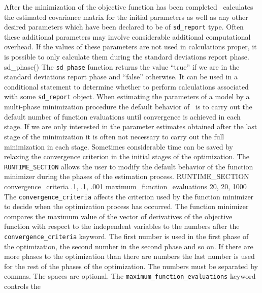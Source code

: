 \documentclass[12pt]{book}
\begin{document}
After the minimization of the objective function has been completed
\ADM\ calculates the estimated covariance matrix for the
initial parameters as well as any other desired parameters which
have been declared to be of {\tt sd\_report} type. Often 
these additional parameters may involve
considerable additional computational overhead. If the values of 
these parameters are not used in calculations proper, it is possible to
only calculate them during the standard deviations report phase.
\beginexample 
sd_phase()
\endexample
\noindent The {\tt sd\_phase} function returns the value ``true'' if
we are in the standard deviations report phase and ``false''
otherwise. It can be used in a conditional statement to determine
whether to perform calculations associated with some 
{\tt sd\_report} object. 
When  estimating the parameters of a model by a multi-phase
minimization procedure the default behavior of \ADM\ is to
carry out the default number of function evaluations until 
convergence is achieved in each stage. If we are only interested
in the parameter estimates obtained after the last stage of
the minimization it is often not necessary to carry out the 
full minimization in each stage. Sometimes considerable time can be
saved by relaxing the convergence criterion in the
initial stages of the optimization.
The {\tt RUNTIME\_SECTION} allows the user to modify
the default behavior of the function minimizer during the 
phases of the estimation process.
\beginexample
RUNTIME\_SECTION
  convergence_criteria .1, .1, .001
  maximum_function_evaluations 20, 20, 1000
\endexample
\noindent The {\tt convergence\_criteria} affects the criterion used by
the function minimizer to decide when the optimization process has 
occurred.  The function minimizer compares the maximum value of the
vector of derivatives of the objective function with respect to the
independent variables to the numbers after the
{\tt convergence\_criteria} keyword. The first number is used in the
first phase of the optimization, the second number in the second phase
and so on. If there are more phases to the optimization than
there are numbers the last number is used for the rest of the
phases of the optimization.
The numbers must be separated by commas. The spaces are optional.
The {\tt maximum\_function\_evaluations} keyword controls the 
\end{document}

